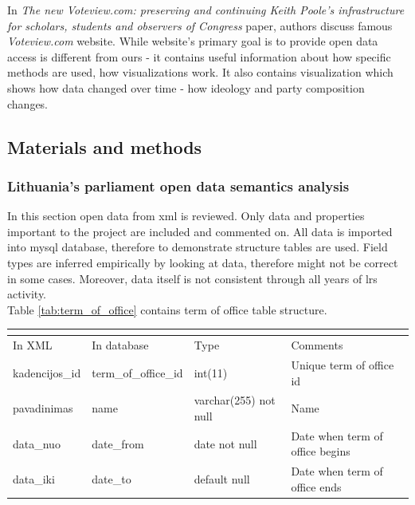 \documentclass[a4paper,12pt]{article}
\begin{document}
	In \textit{The new Voteview.com: preserving and continuing Keith Poole’s infrastructure for scholars, students and observers of Congress} \cite{article} paper, authors discuss famous \textit{Voteview.com} website. While website's primary goal is to provide open data access is different from ours - it contains useful information about how specific methods are used, how visualizations work. It also contains visualization which shows how data changed over time - how ideology and party composition changes.
	
	
	
	
	\clearpage
	
	\subsection{Materials and methods}
	
	\subsubsection{Lithuania's parliament open data semantics analysis }
	
	In this section open data from \acrshort{xml} is reviewed. Only data and properties important to the project are included and commented on. All data is imported into \gls{mysql} database, therefore to demonstrate structure tables are used. Field types are inferred empirically by looking at data, therefore might not be correct in some cases. Moreover, data itself is not consistent through all years of \acrlong{lrs} activity.\\
	
	\noindent
	Table \ref{tab:term_of_office} contains term of office table structure.
	\begin{center}
		\begin{tabular}{L{3cm} L{3cm} L{2.2cm} L{3.8cm}}
			\\ 
			\hline
			In XML & In database & Type & Comments\\
			\hline 
			kadencijos\_id & term\_of\_office\_id & int(11) & Unique term of office id \\ 
			pavadinimas & name & varchar(255) not null & Name \\
			data\_nuo & date\_from & date not null & Date when term of office begins \\ 
			data\_iki & date\_to & default null & Date when term of office ends \\
			\hline
		\end{tabular} \label{tab:term_of_office}
	\end{center}
	
\end{document}
